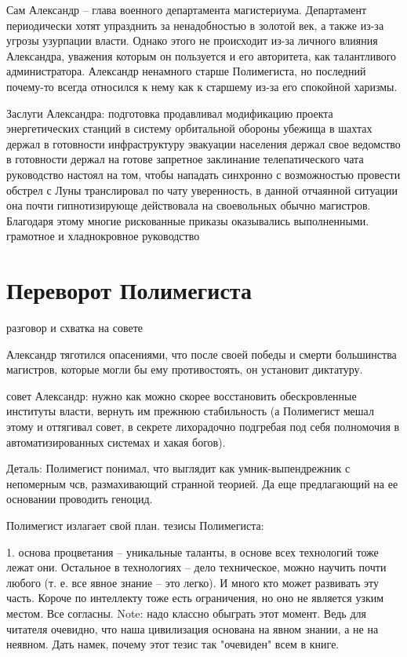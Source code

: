 \documentclass[12pt,a4paper]{article}
\begin{document}
Сам Александр -- глава военного департамента магистериума. Департамент периодически хотят упразднить за ненадобностью в золотой век, а также из-за угрозы узурпации власти. Однако этого не происходит из-за личного влияния Александра, уважения которым он пользуется и его авторитета, как талантливого администратора. Александр ненамного старше Полимегиста, но последний почему-то всегда относился к нему как к старшему из-за его спокойной харизмы.

Заслуги Александра:
подготовка
	продавливал модификацию проекта энергетических станций в систему орбитальной обороны
	убежища в шахтах
	держал в готовности инфраструктуру эвакуации населения
	держал свое ведомство в готовности
	держал на готове запретное заклинание телепатического чата
руководство
	настоял на том, чтобы нападать синхронно с возможностью провести обстрел с Луны
	транслировал по чату уверенность, в данной отчаянной ситуации она почти гипнотизирующе действовала на своевольных обычно магистров. Благодаря этому многие рискованные приказы оказывались выполненными.
	грамотное и хладнокровное руководство


\section*{Переворот Полимегиста}
разговор и схватка на совете

Александр тяготился опасениями, что после своей победы и смерти большинства магистров, которые могли бы ему противостоять, он установит диктатуру. 

совет
Александр: нужно как можно скорее восстановить обескровленные институты власти, вернуть им прежнюю стабильность (а Полимегист мешал этому и оттягивал совет, в секрете лихорадочно подгребая под себя полномочия в автоматизированных системах и хакая богов).

Деталь: Полимегист понимал, что выглядит как умник-выпендрежник с непомерным чсв, размахивающий странной теорией. Да еще предлагающий на ее основании проводить геноцид.

Полимегист излагает свой план.
тезисы Полимегиста:

1. основа процветания -- уникальные таланты, в основе всех технологий тоже лежат они. Остальное в технологиях -- дело техническое, можно научить почти любого (т. е. все явное знание -- это легко). И много кто может развивать эту часть. Короче по интеллекту тоже есть ограничения, но оно не является узким местом. Все согласны. Note: надо классно обыграть этот момент. Ведь для читателя очевидно, что наша цивилизация основана на явном знании, а не на неявном. Дать намек, почему этот тезис так "очевиден" всем в книге.
\end{document}
